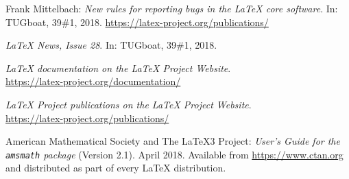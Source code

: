 \documentclass{ltnews}
\begin{document}
\begin{thebibliography}{9}
  
 Frank Mittelbach:
  \emph{New rules for reporting bugs in the \LaTeX{} core software}.  
  In: TUGboat, 39\#1, 2018.
  \url{https://latex-project.org/publications/}

  \emph{\LaTeX{} News, Issue 28}.  
  In: TUGboat, 39\#1, 2018.\\

  \emph{\LaTeX{} documentation on the \LaTeX{} Project Website}.\\  
  \url{https://latex-project.org/documentation/}

  \emph{\LaTeX{} Project publications on the \LaTeX{} Project Website}.\\
  \url{https://latex-project.org/publications/}

 American Mathematical Society and The \LaTeX3 Project:
  \emph{User's Guide for the \texttt{amsmath} package} (Version 2.1).  
  April 2018.
  Available from
  \url{https://www.ctan.org}
  and distributed as part of every \LaTeX{} distribution.

\end{thebibliography}
\end{document}
